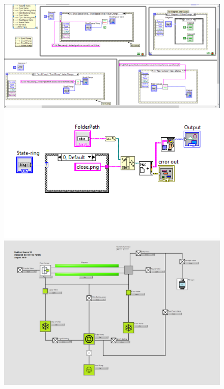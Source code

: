 \documentclass[12pt,a4paper]{article}
\begin{document}
\begin{figure}[h]
\centering
\includegraphics[scale=0.1]{Block-Diagram}
\includegraphics[scale=0.5]{SubVI}
\includegraphics[scale=0.25]{InterFace}
\end{figure}
\end{document}
